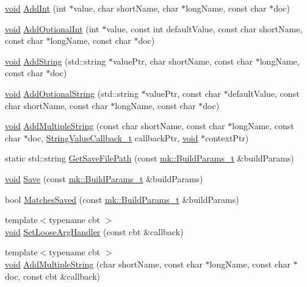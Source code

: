 \begin{DoxyCompactItemize}
\item 
\hyperlink{_t_e_m_p_l_a_t_e__cdef_8h_ac9c84fa68bbad002983e35ce3663c686}{void} \hyperlink{namespacecli_1_1args_a1ea2eebf427287004406675bac1cda88}{Add\+Int} (int $\ast$value, char short\+Name, char $\ast$long\+Name, const char $\ast$doc)
\item 
\hyperlink{_t_e_m_p_l_a_t_e__cdef_8h_ac9c84fa68bbad002983e35ce3663c686}{void} \hyperlink{namespacecli_1_1args_ad6ed75fec45da0ed1d0514d1a542df9a}{Add\+Optional\+Int} (int $\ast$value, const int default\+Value, const char short\+Name, const char $\ast$long\+Name, const char $\ast$doc)
\item 
\hyperlink{_t_e_m_p_l_a_t_e__cdef_8h_ac9c84fa68bbad002983e35ce3663c686}{void} \hyperlink{namespacecli_1_1args_a836b0c85959991841590fa025b891fa2}{Add\+String} (std\+::string $\ast$value\+Ptr, char short\+Name, const char $\ast$long\+Name, const char $\ast$doc)
\item 
\hyperlink{_t_e_m_p_l_a_t_e__cdef_8h_ac9c84fa68bbad002983e35ce3663c686}{void} \hyperlink{namespacecli_1_1args_aaf090dc23a9c788d979f88ba0c5b3d1b}{Add\+Optional\+String} (std\+::string $\ast$value\+Ptr, const char $\ast$default\+Value, const char short\+Name, const char $\ast$long\+Name, const char $\ast$doc)
\item 
\hyperlink{_t_e_m_p_l_a_t_e__cdef_8h_ac9c84fa68bbad002983e35ce3663c686}{void} \hyperlink{namespacecli_1_1args_aa3da37570bde00f6fd12e49fe4493c33}{Add\+Multiple\+String} (const char short\+Name, const char $\ast$long\+Name, const char $\ast$doc, \hyperlink{namespacecli_1_1args_aa08565ab872ff119b0a21d4bbe1d8e4e}{String\+Value\+Callback\+\_\+t} callback\+Ptr, \hyperlink{_t_e_m_p_l_a_t_e__cdef_8h_ac9c84fa68bbad002983e35ce3663c686}{void} $\ast$context\+Ptr)
\item 
static std\+::string \hyperlink{namespacecli_1_1args_a74cf8e07412e1954d295471edda8cfb5}{Get\+Save\+File\+Path} (const \hyperlink{structmk_1_1_build_params__t}{mk\+::\+Build\+Params\+\_\+t} \&build\+Params)
\item 
\hyperlink{_t_e_m_p_l_a_t_e__cdef_8h_ac9c84fa68bbad002983e35ce3663c686}{void} \hyperlink{namespacecli_1_1args_a091fd931f9c5a74d36d4db3f22ad4828}{Save} (const \hyperlink{structmk_1_1_build_params__t}{mk\+::\+Build\+Params\+\_\+t} \&build\+Params)
\item 
bool \hyperlink{namespacecli_1_1args_ae26d7243363b2d48f581971dbcecfb55}{Matches\+Saved} (const \hyperlink{structmk_1_1_build_params__t}{mk\+::\+Build\+Params\+\_\+t} \&build\+Params)
\item 
{\footnotesize template$<$typename cbt $>$ }\\\hyperlink{_t_e_m_p_l_a_t_e__cdef_8h_ac9c84fa68bbad002983e35ce3663c686}{void} \hyperlink{namespacecli_1_1args_a24cdf0ed52ed82b00224fd2e0493c716}{Set\+Loose\+Arg\+Handler} (const cbt \&callback)
\item 
{\footnotesize template$<$typename cbt $>$ }\\\hyperlink{_t_e_m_p_l_a_t_e__cdef_8h_ac9c84fa68bbad002983e35ce3663c686}{void} \hyperlink{namespacecli_1_1args_aea6417d4c163b0de7d05d1b46b76a81d}{Add\+Multiple\+String} (char short\+Name, const char $\ast$long\+Name, const char $\ast$doc, const cbt \&callback)
\end{DoxyCompactItemize}
